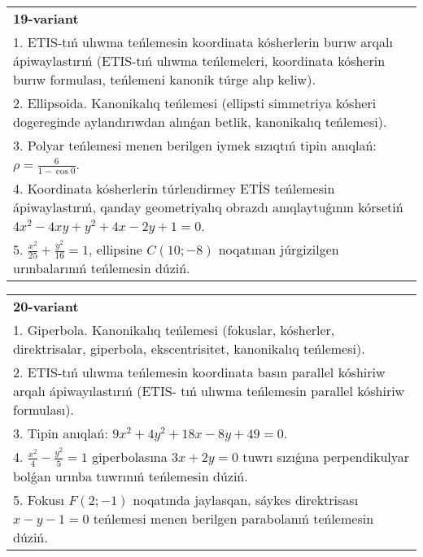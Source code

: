 \documentclass{article}
\begin{document}
\begin{tabular}{m{17cm}}
\textbf{19-variant}\\
1. ETIS-tıń ulıwma teńlemesin koordinata kósherlerin burıw arqalı ápiwaylastırıń (ETIS-tıń ulıwma teńlemeleri, koordinata kósherin burıw formulası, teńlemeni kanonik túrge alıp keliw).\\

2. Ellipsoida. Kanonikalıq teńlemesi (ellipsti simmetriya kósheri dogereginde aylandırıwdan alınǵan betlik, kanonikalıq teńlemesi).\\

3. Polyar teńlemesi menen berilgen iymek sızıqtıń tipin anıqlań: $\rho=\frac{6}{1-\cos 0}$.\\

4. Koordinata kósherlerin túrlendirmey ETİS teńlemesin ápiwaylastırıń, qanday geometriyalıq obrazdı anıqlaytuǵının kórsetiń $4x^{2} - 4xy + y^{2} + 4x - 2y + 1 = 0$.  \\

5. $\frac{x^{2}}{25} + \frac{y^{2}}{16} = 1$, ellipsine $C(10; - 8)$ noqatınan júrgizilgen urınbalarınıń teńlemesin dúziń.  
\end{tabular}
\vspace{1cm}


\begin{tabular}{m{17cm}}
\textbf{20-variant}\\
1. Giperbola. Kanonikalıq teńlemesi (fokuslar, kósherler, direktrisalar, giperbola, ekscentrisitet, kanonikalıq teńlemesi).\\

2. ETIS-tıń ulıwma teńlemesin koordinata basın parallel kóshiriw arqalı ápiwayılastırıń (ETIS- tıń ulıwma teńlemesin parallel kóshiriw formulası).\\

3. Tipin anıqlań: $9 x^{2}+4 y^{2}+18 x-8 y+49=0$.\\

4. $\frac{x^{2}}{4} - \frac{y^{2}}{5} = 1$ giperbolasına $3x + 2y = 0$ tuwrı sızıǵına perpendikulyar bolǵan urınba tuwrınıń teńlemesin dúziń.\\

5. Fokusı $F(2; - 1)$ noqatında jaylasqan, sáykes direktrisası $x - y - 1 = 0$ teńlemesi menen berilgen parabolanıń teńlemesin dúziń.  
\end{tabular}
\vspace{1cm}
\end{document}
